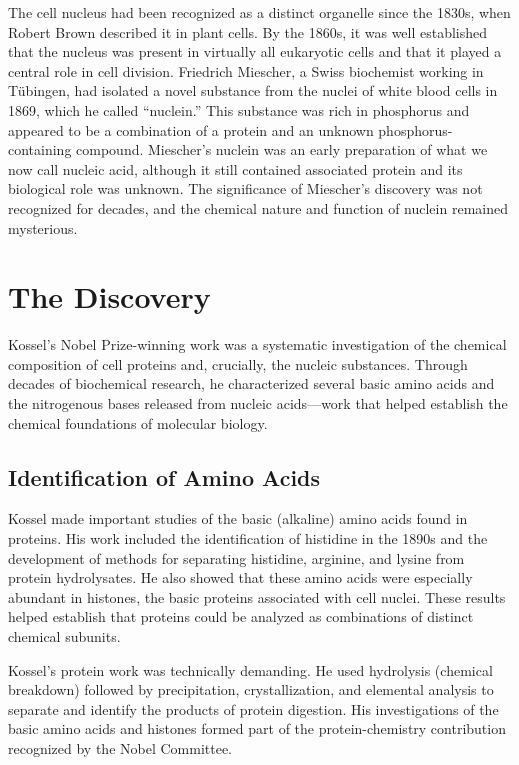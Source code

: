 The cell nucleus had been recognized as a distinct organelle since the 1830s, when Robert Brown described it in plant cells. By the 1860s, it was well established that the nucleus was present in virtually all eukaryotic cells and that it played a central role in cell division. Friedrich Miescher, a Swiss biochemist working in T\"ubingen, had isolated a novel substance from the nuclei of white blood cells in 1869, which he called ``nuclein.'' This substance was rich in phosphorus and appeared to be a combination of a protein and an unknown phosphorus-containing compound. Miescher's nuclein was an early preparation of what we now call nucleic acid, although it still contained associated protein and its biological role was unknown. The significance of Miescher's discovery was not recognized for decades, and the chemical nature and function of nuclein remained mysterious.

\section{The Discovery}

Kossel's Nobel Prize-winning work was a systematic investigation of the chemical composition of cell proteins and, crucially, the nucleic substances. Through decades of biochemical research, he characterized several basic amino acids and the nitrogenous bases released from nucleic acids---work that helped establish the chemical foundations of molecular biology.

\subsection{Identification of Amino Acids}

Kossel made important studies of the basic (alkaline) amino acids found in proteins. His work included the identification of histidine in the 1890s and the development of methods for separating histidine, arginine, and lysine from protein hydrolysates. He also showed that these amino acids were especially abundant in histones, the basic proteins associated with cell nuclei. These results helped establish that proteins could be analyzed as combinations of distinct chemical subunits.\cite{kossel-history}

Kossel's protein work was technically demanding. He used hydrolysis (chemical breakdown) followed by precipitation, crystallization, and elemental analysis to separate and identify the products of protein digestion. His investigations of the basic amino acids and histones formed part of the protein-chemistry contribution recognized by the Nobel Committee.\cite{nobel-1910,lecture-1910}

